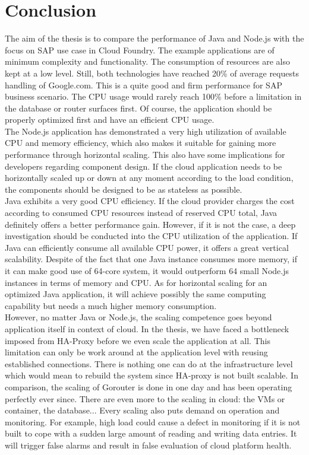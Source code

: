 \chapter{Conclusion}
The aim of the thesis is to compare the performance of Java and Node.js with the focus on SAP use case in Cloud Foundry. The example applications are of minimum complexity and functionality. The consumption of resources are also kept at a low level. Still, both technologies have reached 20\% of average requests handling of Google.com\citep{Google}. This is a quite good and firm performance for SAP business scenario. The CPU usage would rarely reach 100\% before a limitation in the database or router surfaces first. Of course, the application should be properly optimized first and have an efficient CPU usage.\\
The Node.js application has demonstrated a very high utilization of available CPU and memory efficiency, which also makes it suitable for gaining more performance through horizontal scaling. This also have some implications for developers regarding component design. If the cloud application needs to be horizontally scaled up or down at any moment according to the load condition, the components should be designed to be as stateless as possible.\\
Java exhibits a very good CPU efficiency. If the cloud provider charges the cost according to consumed CPU resources instead of reserved CPU total, Java definitely offers a better performance gain. However, if it is not the case, a deep investigation should be conducted into the CPU utilization of the application. If Java can efficiently consume all available CPU power, it offers a great vertical scalability. Despite of the fact that one Java instance consumes more memory, if it can make good use of 64-core system, it would outperform 64 small Node.js instances in terms of memory and CPU. As for horizontal scaling for an optimized Java application, it will achieve possibly the same computing capability but needs a much higher memory consumption. \\
However, no matter Java or Node.js, the scaling competence goes beyond application itself in context of cloud. In the thesis, we have faced a bottleneck imposed from HA-Proxy before we even scale the application at all. This limitation can only be work around at the application level with reusing established connections. There is nothing one can do at the infrastructure level which would mean to rebuild the system since HA-proxy is not built scalable. In comparison, the scaling of Gorouter is done in one day and has been operating perfectly ever since. There are even more to the scaling in cloud: the VMs or container, the database... Every scaling also puts demand on operation and monitoring. For example, high load could cause a defect in monitoring if it is not built to cope with a sudden large amount of reading and writing data entries. It will trigger false alarms and result in false evaluation of cloud platform health. 